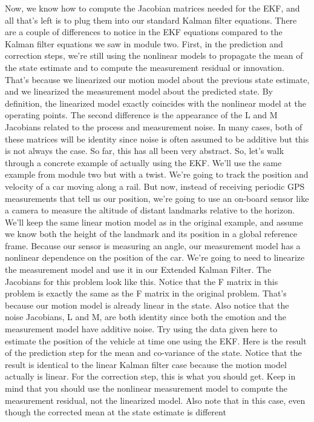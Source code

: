 Now, we know how to compute the
Jacobian matrices needed for the EKF, and all that's left is to plug them into our standard Kalman
filter equations. There are a couple of
differences to notice in the EKF equations compared to the Kalman filter equations
we saw in module two. First, in the prediction
and correction steps, we're still using the nonlinear models
to propagate the mean of the state estimate and to compute
the measurement residual or innovation. That's because we
linearized our motion model about the previous state estimate, and we linearized the measurement model
about the predicted state. By definition,
the linearized model exactly coincides with the nonlinear model
at the operating points. The second difference
is the appearance of the L and M Jacobians related to
the process and measurement noise. In many cases, both of these matrices
will be identity since noise is often assumed to be additive
but this is not always the case. So far, this has all been very abstract. So, let's walk through a concrete
example of actually using the EKF. We'll use the same example from
module two but with a twist. We're going to track the position and velocity of a car moving along a rail. But now, instead of receiving periodic GPS measurements
that tell us our position, we're going to use
an on-board sensor like a camera to measure the altitude of distant
landmarks relative to the horizon. We'll keep the same linear motion model
as in the original example, and assume we know both the height of the landmark and its position
in a global reference frame. Because our sensor is measuring an angle, our measurement model has a nonlinear dependence on
the position of the car. We're going to need to linearize the measurement model and use it
in our Extended Kalman Filter. The Jacobians for
this problem look like this. Notice that the F matrix
in this problem is exactly the same as the F matrix
in the original problem. That's because our motion model
is already linear in the state. Also notice that
the noise Jacobians, L and M, are both identity since both the emotion and the measurement
model have additive noise. Try using the data given here
to estimate the position of the vehicle at time one using the EKF. Here is the result of the prediction step for the mean and
co-variance of the state. Notice that the result is identical to the linear Kalman filter case because
the motion model actually is linear. For the correction step, this is what you should get. Keep in mind that you should use the nonlinear measurement model to
compute the measurement residual, not the linearized model. Also note that in this case, even though the corrected mean at the state estimate is different

